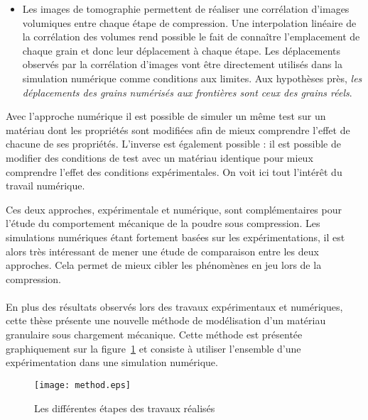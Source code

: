 \begin{itemize}
\begin{itemize}
		\item Les images de tomographie permettent de réaliser une corrélation d'images volumiques entre chaque étape de compression. Une interpolation linéaire de la corrélation des volumes rend possible le fait de connaître l'emplacement de chaque grain et donc leur déplacement à chaque étape. Les déplacements observés par la corrélation d'images vont être directement utilisés dans la simulation numérique comme conditions aux limites. Aux hypothèses près, \emph{les déplacements des grains numérisés aux frontières sont ceux des grains réels}.
	\end{itemize}
	Avec l'approche numérique il est possible de simuler un même test sur un matériau dont les propriétés sont modifiées afin de mieux comprendre l'effet de chacune de ses propriétés. L'inverse est également possible : il est possible de modifier des conditions de test avec un matériau identique pour mieux comprendre l'effet des conditions expérimentales. On voit ici tout l'intérêt du travail numérique.
\end{itemize}
Ces deux approches, expérimentale et numérique, sont complémentaires pour l'étude du comportement mécanique de la poudre sous compression. Les simulations numériques étant fortement basées sur les expérimentations, il est alors très intéressant de mener une étude de comparaison entre les deux approches. Cela permet de mieux cibler les phénomènes en jeu lors de la compression.
\paragraph{}En plus des résultats observés lors des travaux expérimentaux et numériques, cette thèse présente une nouvelle méthode de modélisation d'un matériau granulaire sous chargement mécanique. Cette méthode est présentée graphiquement sur la figure~\ref{fig:02-method} et consiste à utiliser l'ensemble d'une expérimentation dans une simulation numérique.
\begin{figure}\centering
	\texttt{[image: method.eps]}
	\caption{\label{fig:02-method}Les différentes étapes des travaux réalisés}
\end{figure}
